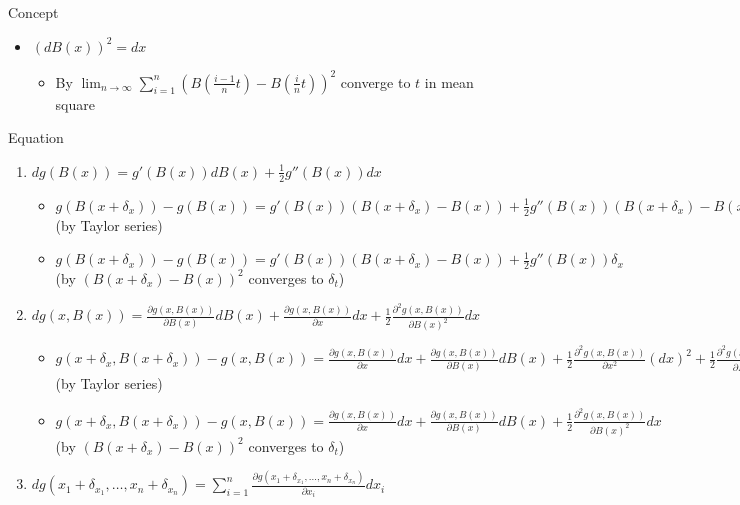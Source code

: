 \documentclass[a4paper]{article}
\begin{document}
\begin{itemize}
\begin{itemize}
\begin{enumerate}
                        Concept
                        \begin{itemize}
                            \item $(d B(x))^2 = d x$
                                \begin{itemize}
                                    \item By $\lim_{n \rightarrow \infty} \sum_{i=1}^n (B(\frac{i-1}{n}t) - B(\frac{i}{n}t))^2$ converge to $t$ in mean square
                                \end{itemize}
                        \end{itemize}
                        Equation
                        \begin{enumerate}
                            \item $d g(B(x)) = g'(B(x)) d B(x) + \frac{1}{2} g''(B(x)) dx$
                                \begin{itemize}
                                    \item $g(B(x + \delta_x)) - g(B(x)) = g'(B(x)) (B(x+\delta_x) - B(x)) + \frac{1}{2} g''(B(x)) (B(x+\delta_x) - B(x))^2$ (by Taylor series)
                                    \item $g(B(x + \delta_x)) - g(B(x)) = g'(B(x)) (B(x+\delta_x) - B(x)) + \frac{1}{2} g''(B(x)) \delta_x$ (by $(B(x+\delta_x) - B(x))^2$ converges to $\delta_t$)
                                \end{itemize}
                            \item $d g(x, B(x)) = \frac{\partial g(x, B(x))}{\partial B(x)} d B(x) + \frac{\partial g(x, B(x))}{\partial x} d x + \frac{1}{2} \frac{\partial^2 g(x, B(x))}{\partial B(x)^2} d x$
                                \begin{itemize}
                                    \item $g(x + \delta_x, B(x + \delta_x)) - g(x, B(x)) = \frac{\partial g(x, B(x))}{\partial x} d x + \frac{\partial g(x, B(x))}{\partial B(x)} d B(x) + \frac{1}{2} \frac{\partial^2 g(x, B(x))}{\partial x^2} (d x)^2 + \frac{1}{2} \frac{\partial^2 g(x, B(x))}{\partial B(x)^2} (d B(x))^2 + \frac{\partial^2 g(x, B(x))}{\partial x \partial B(x)} d x d B(x)$ (by Taylor series)
                                    \item $g(x + \delta_x, B(x + \delta_x)) - g(x, B(x)) = \frac{\partial g(x, B(x))}{\partial x} d x + \frac{\partial g(x, B(x))}{\partial B(x)} d B(x) + \frac{1}{2} \frac{\partial^2 g(x, B(x))}{\partial B(x)^2} d x$ (by $(B(x+\delta_x) - B(x))^2$ converges to $\delta_t$)
                                \end{itemize}
                            \item $d g(x_1+ \delta_{x_1}, \dots, x_n + \delta_{x_n}) = \sum_{i=1}^n \frac{\partial g(x_1 + \delta_{x_1}, \dots, x_n + \delta_{x_n})}{\partial x_i} d x_i$


\end{enumerate}
\end{enumerate}
\end{itemize}
\end{itemize}
\end{document}
